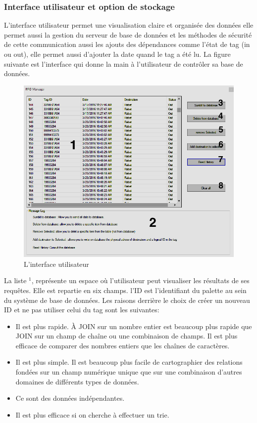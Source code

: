 \documentclass[11pt, a4paper, twoside]{book}
\begin{document}
\subsubsection{Interface utilisateur et option de stockage}
L'interface utilisateur permet une visualisation claire et organisée des données elle permet aussi la gestion du serveur de base de données et les méthodes de sécurité de cette communication aussi les ajouts des dépendances comme l'état de tag (in ou out), elle permet aussi d'ajouter la date quand le tag a été lu. La figure suivante est l'interface qui donne la main à l'utilisateur de contrôler sa base de données.\\

\begin{figure}[H]
\centering
\includegraphics[width=\textwidth]{software}
\caption{L'interface utilisateur}
\end{figure}
La liste \(^{1}\), représente un espace où l'utilisateur peut visualiser les résultats de ses requêtes. Elle est repartie en six champs. l'ID est l'identifiant du palette au sein du système de base de données. Les raisons derrière le choix de créer un nouveau ID et ne pas utiliser celui du tag sont les suivantes:
\begin{itemize}
\item Il est plus rapide. À JOIN sur un nombre entier est beaucoup plus rapide que JOIN sur un champ de chaîne ou une combinaison de champs. Il est plus efficace de comparer des nombres entiers que les chaînes de caractères.

\item Il est plus simple. Il est beaucoup plus facile de cartographier des relations fondées sur un champ numérique unique que sur une combinaison d'autres domaines de différents types de données.

\item Ce sont des données indépendantes.

\item  Il est plus efficace si on cherche à effectuer un trie.\\
\end{itemize}
\end{document}
